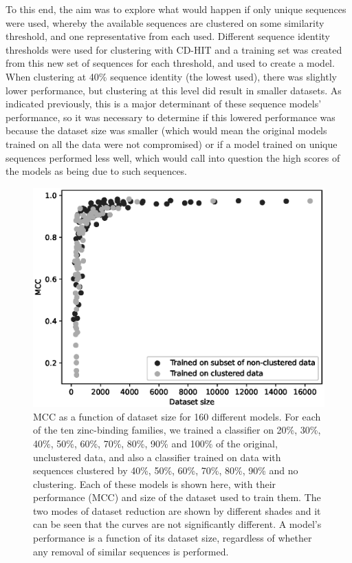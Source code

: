 To this end, the aim was to explore what would happen if only unique sequences were used, whereby the available sequences are clustered on some similarity threshold, and one representative from each used. Different sequence identity thresholds were used for clustering with CD-HIT and a training set was created from this new set of sequences for each threshold, and used to create a model. When clustering at 40\% sequence identity (the lowest used), there was slightly lower performance, but clustering at this level did result in smaller datasets. As indicated previously, this is a major determinant of these sequence models' performance, so it was necessary to determine if this lowered performance was because the dataset size was smaller (which would mean the original models trained on all the data were not compromised) or if a model trained on unique sequences performed less well, which would call into question the high scores of the models as being due to such sequences.

\begin{figure}
\centering
\includegraphics[width=1.0\textwidth]{Figures/clustering.eps}
\caption[MCC as a function of dataset size for 160 different models.]{\label{fig:clustering} MCC as a function of dataset size for
  160 different models.
  For each of the ten zinc-binding families, we trained a
  classifier on 20\%, 30\%, 40\%, 50\%, 60\%, 70\%, 80\%, 90\% and
  100\% of the original, unclustered data, and also a classifier
  trained on data with sequences clustered by 40\%, 50\%, 60\%, 70\%,
  80\%, 90\% and no clustering. Each of these models is shown here,
  with their performance (MCC) and size of the dataset used to train
  them. The two modes of dataset reduction are shown by different
  shades and it can be seen that the curves are not significantly
  different. A
  model's performance is a function of its dataset size, regardless of
  whether any removal of similar sequences is performed.}
\end{figure}

